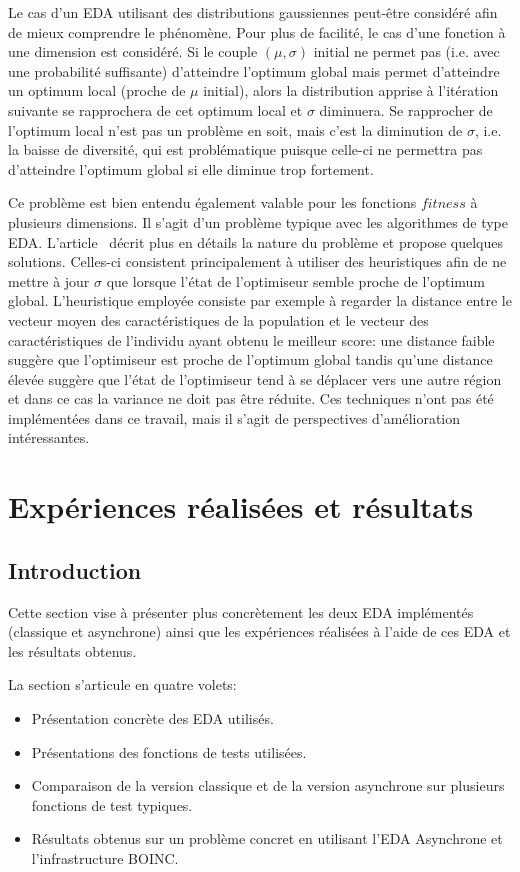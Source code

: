 \documentclass[a4paper, 11pt]{report}
\begin{document}
Le cas d'un EDA utilisant des distributions gaussiennes peut-être considéré afin de mieux comprendre le phénomène. Pour plus de facilité, le cas d'une fonction à une dimension est considéré. Si le couple $(\mu, \sigma)$ initial ne permet pas (i.e. avec une probabilité suffisante) d'atteindre l'optimum global mais permet d'atteindre un optimum local (proche de $\mu$ initial), alors la distribution apprise à l'itération suivante se rapprochera de cet optimum local et $\sigma$ diminuera. Se rapprocher de l'optimum local n'est pas un problème en soit, mais c'est la diminution de $\sigma$, i.e. la baisse de diversité, qui est problématique puisque celle-ci ne permettra pas d'atteindre l'optimum global si elle diminue trop fortement.

Ce problème est bien entendu également valable pour les fonctions $fitness$ à plusieurs dimensions. Il s'agit d'un problème typique avec les algorithmes de type EDA. L'article~\cite{DIVERSITE} décrit plus en détails la nature du problème et propose quelques solutions. Celles-ci consistent principalement à utiliser des heuristiques afin de ne mettre à jour $\sigma$ que lorsque l'état de l'optimiseur semble proche de l'optimum global. L'heuristique employée consiste par exemple à regarder la distance entre le vecteur moyen des caractéristiques de la population et le vecteur des caractéristiques de l'individu ayant obtenu le meilleur score: une distance faible suggère que l'optimiseur est proche de l'optimum global tandis qu'une distance élevée suggère que l'état de l'optimiseur tend à se déplacer vers une autre région et dans ce cas la variance ne doit pas être réduite. Ces techniques n'ont pas été implémentées dans ce travail, mais il s'agit de perspectives d'amélioration intéressantes.

\section{Expériences réalisées et résultats}
\label{results}
\subsection{Introduction}
Cette section vise à présenter plus concrètement les deux EDA implémentés (classique et asynchrone) ainsi que les expériences réalisées à l'aide de ces EDA et les résultats obtenus. %

La section s'articule en quatre volets:
\begin{itemize}
\item Présentation concrète des EDA utilisés.
\item Présentations des fonctions de tests utilisées.
\item Comparaison de la version classique et de la version asynchrone sur plusieurs fonctions de test typiques.
\item Résultats obtenus sur un problème concret en utilisant l'EDA Asynchrone et l'infrastructure BOINC.
\end{itemize}
\end{document}
